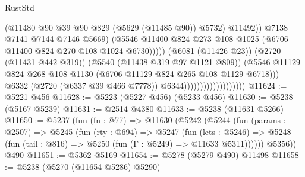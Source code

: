 \begin{lexlean}{RustStd}
\begin{coremodule}
                                                        (@11480
                                                          @90
                                                          @39
                                                          @90
                                                          @829
                                                          (@5629 (@11485 @90))
                                                          @5732)
                                                        @11492))
                                                    @7138
                                                    @7141
                                                    @7144
                                                    @7146
                                                    @5669)
                                                  (@5546
                                                    @11400
                                                    @824
                                                    @273
                                                    @108
                                                    @1025
                                                    (@6706 @11400 @824 @270 @108 @1024 @6730)))))
                                            (@6081 (@11426 @23))
                                            (@2720 (@11431 @442 @319))
                                            (@5540 (@11438 @319 @97 @1121 @809))
                                            (@5546
                                              @11129
                                              @824
                                              @268
                                              @108
                                              @1130
                                              (@6706 @11129 @824 @265 @108 @1129 @6718)))
                                          @6332
                                          (@2720 (@6337 @39 @466 @7778))
                                          @6344)))))))))))))))))))
@11624 := @5221 @456
@11628 := @5223 (@5227 @456) (@5233 @456)
@11630 := @5238 (@5167 @5239)
@11631 := @2514 @4380
@11633 := @5238 (@11631 @5266)
@11650 := @5237
    (fun (fn : @77) =>
    @11630
      (@5242
        (@5244
          (fun (params : @2507) =>
          @5245
            (fun (rty : @694) =>
            @5247
              (fun (lets : @5246) =>
              @5248 (fun (tail : @816) => @5250 (fun (Γ : @5249) => @11633 @5311))))))
        @5356))
    @490
@11651 := @5362 @5169
@11654 := @5278 (@5279 @490) @11498
@11658 := @5238 (@5270 (@11654 @5286) @5290)

\end{coremodule}
\end{lexlean}
